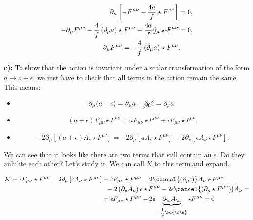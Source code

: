 \begin{equation}
	\begin{split}
		\partial_{\mu}\left[-F^{\mu \nu}-\frac{4 a}{f} \star F^{\mu \nu}\right]&=0,\\
			-\partial_{\mu} F^{\mu \nu}-\frac{4}{f}\left(\partial_{\mu} a\right) \star F^{\mu \nu}-\frac{4 a}{f} \cancel{\partial_{\mu} \star F^{\mu\nu}}&=0, \\
			 \partial_{\mu} F^{\mu \nu}=-\frac{4}{f}\left(\partial_{\mu} a\right) \star F ^{\mu \nu}&.
		\end{split}
\end{equation}


\textbf{c):}
To show that the action is invariant under a scalar transformation of the form $a \rightarrow a + \epsilon$, we just have to check that all terms in the action remain the same. This means:

\begin{itemize}
	\item
	\begin{equation}
		\partial_{\mu}(a+\epsilon)=\partial_{\mu} a+\cancel{\partial_{\mu} \epsilon}=\partial_{\mu} a.
	\end{equation}

	\item
	\begin{equation}
		(a+\epsilon) F_{\mu \nu} \star F^{\mu \nu} = a F_{\mu \nu} \star F^{\mu \nu}+\epsilon F_{\mu \nu} \star F^{\mu \nu}.
	\end{equation}

	\item
	\begin{equation}
		-2 \partial_{\mu}\left[(a+\epsilon) A_{\nu} \star F^{\mu \nu}\right]=-2 \partial_{\mu}\left[a A_{\nu} \star F^{\mu \nu}\right]-2 \partial_{\mu}\left[\epsilon A_{\nu} \star F^{\mu \nu}\right].
	\end{equation}

\end{itemize}

We can see that it looks like there are two terms that still contain an $\epsilon$. Do they anhilite each other? Let's study it. We can call $K$ to this term and expand.

\begin{equation}
	\begin{split}
		K=\epsilon F_{\mu \nu} \star F^{\mu \nu}-2 \partial_{\mu}\left[\epsilon A_{\nu} \star F^{\mu \nu}\right] &=\epsilon F_{\mu \nu} \star F^{\mu \nu}-2 \cancel{\left(\partial_{\mu} \epsilon\right)} A_{\nu} \star F^{\mu \nu}\\
		&\:\:\:-2\left(\partial_{\mu} A_{\nu}\right) \epsilon \star F^{\mu \nu}-2  \epsilon \cancel{\left(\partial_{\mu} \star F^{\mu \nu}\right)}A_{\nu} =\\
		&=\epsilon F_{\mu \nu} \star F^{\mu \nu}-2 \epsilon \underbrace{\pd{\m}\vad{\n}}_{= \tfrac{1}{2}\Fd{\m\n}} \star F^{\mu \nu}= 0\\
	\end{split}
\end{equation}

